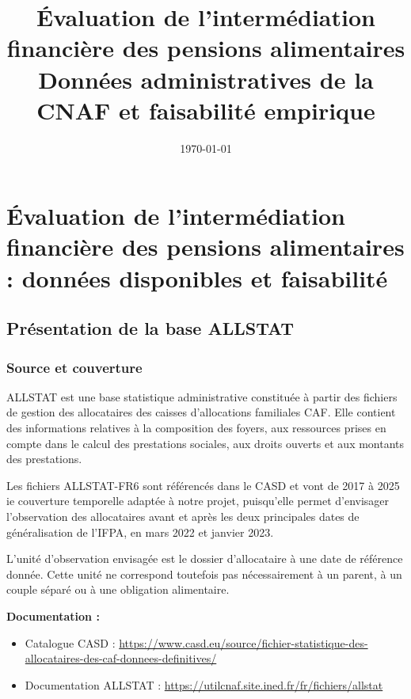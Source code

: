\documentclass[11pt,a4paper]{article}
\title{\textbf{Évaluation de l'intermédiation financière
des pensions alimentaires}\\[0.3cm]
\large Données administratives de la CNAF
et faisabilité empirique}
\author{}
\date{\today}
\begin{document}
\maketitle

\section{Évaluation de l'intermédiation financière
des pensions alimentaires : données disponibles
et faisabilité }


\subsection{Présentation de la base ALLSTAT}

\subsubsection{Source et couverture}

ALLSTAT est une base statistique administrative
constituée à partir des fichiers de gestion des
allocataires des caisses d'allocations familiales CAF.
Elle contient des informations relatives à la
composition des foyers, aux ressources prises en
compte dans le calcul des prestations sociales,
aux droits ouverts et aux montants des prestations.

Les fichiers ALLSTAT-FR6 sont référencés dans
le CASD et vont de 2017 à 2025 ie couverture temporelle  adaptée à notre projet, puisqu'elle permet d'envisager l'observation
des allocataires avant et après les deux principales
dates de généralisation de l'IFPA, en mars 2022
et janvier 2023.

L'unité d'observation envisagée est le dossier
d'allocataire à une date de référence donnée.
Cette unité ne correspond toutefois pas
nécessairement à un parent, à un couple séparé
ou à une obligation alimentaire.

\medskip

\noindent
\textbf{Documentation :}

\begin{itemize}
    \item Catalogue CASD :
    \url{https://www.casd.eu/source/fichier-statistique-des-allocataires-des-caf-donnees-definitives/}

    \item Documentation ALLSTAT :
    \url{https://utilcnaf.site.ined.fr/fr/fichiers/allstat}
\end{itemize}
\end{document}
